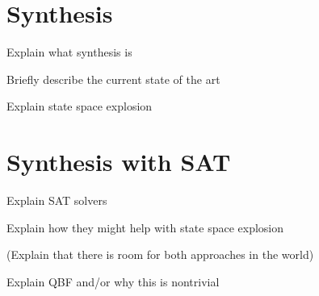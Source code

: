 \section{Synthesis}

Explain what synthesis is

Briefly describe the current state of the art

Explain state space explosion

\section{Synthesis with SAT}

Explain SAT solvers

Explain how they might help with state space explosion

(Explain that there is room for both approaches in the world)

Explain QBF and/or why this is nontrivial
